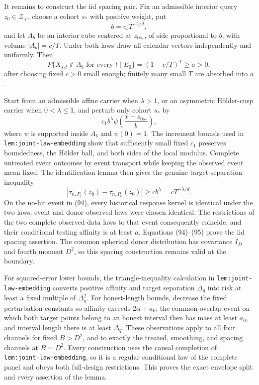 It remains to construct the iid spacing pair.  Fix an admissible interior query \(z_0\in\mathcal Z_+\), choose a cohort \(s_*\) with positive weight, put
\[
b=c_bT^{-1/d},
\]
and let \(A_b\) be an interior cube centered at \(z_{0s_*}\), of side proportional to \(b\), with volume \(|A_b|=c/T\).  Under both laws draw all calendar vectors independently and uniformly.  Then
\[
P\{X_{s_*t}\notin A_b\text{ for every }t\mid E_0\}
=(1-c/T)^T\geq a>0,
\tag{94}
\]
after choosing fixed \(c>0\) small enough; finitely many small \(T\) are absorbed into \(a\).

Start from an admissible affine carrier when \(\lambda>1\), or an asymmetric H\"older-cusp carrier when \(0<\lambda\leq1\), and perturb only cohort \(s_*\) by
\[
c_1b^\lambda\psi\!\left(\frac{x-z_{0s_*}}b\right),
\]
where \(\psi\) is supported inside \(A_b\) and \(\psi(0)=1\).  The increment bounds used in \texttt{lem:joint-law-embedding} show that sufficiently small fixed \(c_1\) preserves boundedness, the H\"older ball, and both sides of the local modulus.  Complete untreated event outcomes by event transport while keeping the observed event mean fixed.  The identification lemma then gives the genuine target-separation inequality
\[
|\tau_{n,P_1}(z_0)-\tau_{n,P_0}(z_0)|
\geq cb^\lambda=cT^{-\lambda/d}.
\tag{95}
\]
On the no-hit event in (94), every historical response kernel is identical under the two laws; event and donor observed laws were chosen identical.  The restrictions of the two complete observed-data laws to that event consequently coincide, and their conditional testing affinity is at least \(a\).  Equations (94)--(95) prove the iid spacing assertion.  The common spherical donor distribution has covariance \(I_D\) and fourth moment \(D^2\), so this spacing construction remains valid at the boundary.

For squared-error lower bounds, the triangle-inequality calculation in \texttt{lem:joint-law-embedding} converts positive affinity and target separation \(\Delta_q\) into risk at least a fixed multiple of \(\Delta_q^2\).  For honest-length bounds, decrease the fixed perturbation constants so affinity exceeds \(2\alpha+a_0\); the common-overlap event on which both target points belong to an honest interval then has mass at least \(a_0\), and interval length there is at least \(\Delta_q\).  These observations apply to all four channels for fixed \(B>D^2\), and to exactly the treated, smoothing, and spacing channels at \(B=D^2\).  Every construction uses the causal completion of \texttt{lem:joint-law-embedding}, so it is a regular conditional law of the complete panel and obeys both full-design restrictions.  This proves the exact envelope split and every assertion of the lemma.

